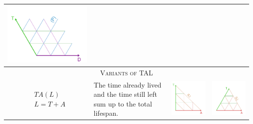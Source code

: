 \documentclass[12pt,oneside,a4paper]{article} %
\begin{document}
\begin{longtable}{m{}m{}m{}m{}}
  \includegraphics[scale=.5]{Figures/DiagramTable/TD_iso.pdf}  \\
  \midrule
  \multicolumn{4}{c}{\textsc{Variants of TAL}} \\
  \midrule
  $$\begin{aligned}
    &TA(L) \\
    &L = T + A
  \end{aligned}$$ &
  The time already lived and the time still left sum up to the total lifespan. &
  \includegraphics[scale=.5]{Figures/DiagramTable/TA_rt.pdf} &
  \includegraphics[scale=.5]{Figures/DiagramTable/TA_iso.pdf}  \\

\end{longtable}
\end{document}
